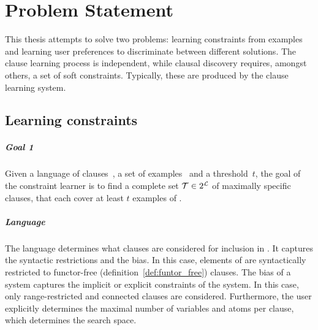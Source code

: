 \chapter{Problem Statement}
\label{cha:problem_statement}




This thesis attempts to solve two problems: learning constraints from examples and learning user preferences to discriminate between different solutions.
The clause learning process is independent, while clausal discovery requires, amongst others, a set of soft constraints.
Typically, these are produced by the clause learning system.

\section{Learning constraints}
\label{sec:learning_constraints}

\begin{framed}
	\noindent
	\begin{minipage}{\textwidth}
		\paragraph{Goal 1}
		Given a language of clauses~, a set of examples~ and a threshold~$t$, the goal of the constraint learner is to find a complete set $\mathcal{T} \in 2^{\mathcal{L}}$ of maximally specific clauses, that each cover at least $t$ examples of .
	\end{minipage}
\end{framed}

\paragraph{Language}
The language  determines what clauses are considered for inclusion in .
It captures the syntactic restrictions and the bias.
In this case, elements of  are syntactically restricted to functor-free (definition~\ref{def:funtor_free}) clauses.
The bias of a system captures the implicit or explicit constraints of the system.
In this case, only range-restricted and connected clauses are considered.
Furthermore, the user explicitly determines the maximal number of variables and atoms per clause, which determines the search space.

